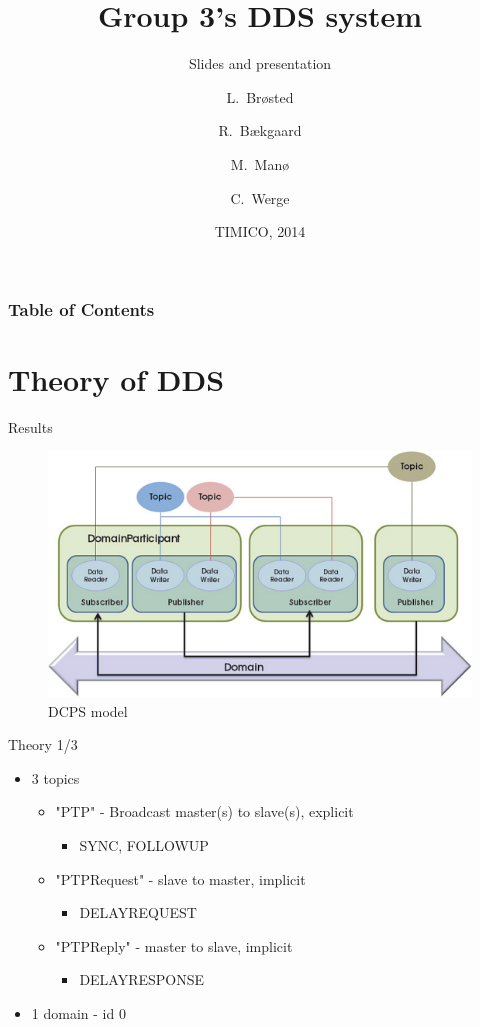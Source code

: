 \documentclass[compressed, presentation, notheorems, 12pt]{beamer}
\title{Group 3's DDS system}
\subtitle{Slides and presentation}
\author[Author, Anders] %
{L.~Brøsted \and R.~Bækgaard \and M.~Manø \and C.~Werge}
\institute
{
  Aarhus University \\
  School of Engineering
}
\date{TIMICO, 2014}
\begin{document}
 	\frame{\titlepage}

\begin{frame}
\frametitle{Table of Contents}
\tableofcontents%
\end{frame}

\section{Theory of DDS}

\begin{frame}{Results}

\begin{figure}[hbtp]
\centering
\includegraphics[width =0.9 \textwidth]{RTI_EntityOverview_small}
\caption{DCPS model}
\label{fig:referenceNavn}
\end{figure}


\end{frame}


\begin{frame}{Theory 1/3}
\begin{itemize}
	\item 3 topics
	\begin{itemize}
		\item "PTP" - Broadcast master(s) to slave(s), explicit
		\begin{itemize}
			\item SYNC, FOLLOWUP
		\end{itemize}
		\item "PTPRequest" - slave to master, implicit
		\begin{itemize}
			\item DELAYREQUEST
		\end{itemize}
		\item "PTPReply" - master to slave, implicit
		\begin{itemize}
		 	\item DELAYRESPONSE
		 \end{itemize} 
	\end{itemize}

	\item  1 domain - id 0
\end{itemize}
\end{frame}
\end{document}
